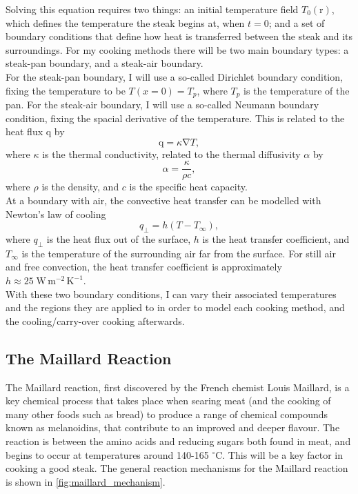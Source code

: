\documentclass[11pt]{article}
\newcommand{\bvec}[1]{\bm{\mathrm{#1}}}
\newcommand{\grad}{\bvec{\nabla}}
\begin{document}
	Solving this equation requires two things: an initial temperature field $T_0(\bvec{r})$, which defines the temperature the steak begins at, when $t=0$; and a set of boundary conditions that define how heat is transferred between the steak and its surroundings. For my cooking methods there will be two main boundary types: a steak-pan boundary, and a steak-air boundary. \\
	
	For the steak-pan boundary, I will use a so-called Dirichlet boundary condition, fixing the temperature to be $T(x=0) = T_p$, where $T_p$ is the temperature of the pan. For the steak-air boundary, I will use a so-called Neumann boundary condition, fixing the spacial derivative of the temperature. This is related to the heat flux $\bvec{q}$ by\cite{heat_equation}
	\begin{equation}
		\bvec{q} = \kappa \grad T,
	\end{equation}
	where $\kappa$ is the thermal conductivity, related to the thermal diffusivity $\alpha$ by
	\begin{equation}
		\alpha = \frac{\kappa}{\rho c},
	\end{equation}
	where $\rho$ is the density, and $c$ is the specific heat capacity. \\
	
	At a boundary with air, the convective heat transfer can be modelled with Newton's law of cooling\cite{convection}
	\begin{equation}
		q_\perp = h(T - T_\infty),
	\end{equation}
	where $q_\perp$ is the heat flux out of the surface, $h$ is the heat transfer coefficient, and $T_\infty$ is the temperature of the surrounding air far from the surface. For still air and free convection, the heat transfer coefficient is approximately $h \approx 25\;\mathrm{W}\,\mathrm{m}^{-2}\,\mathrm{K}^{-1}$\cite{heat_transfer_coeff}. \\
	
	With these two boundary conditions, I can vary their associated temperatures and the regions they are applied to in order to model each cooking method, and the cooling/carry-over cooking afterwards.
	
	\subsection{The Maillard Reaction}
	
	\label{maillard_reaction}
	
	The Maillard reaction, first discovered by the French chemist Louis Maillard\cite{maillard}, is a key chemical process that takes place when searing meat (and the cooking of many other foods such as bread) to produce a range of chemical compounds known as melanoidins, that contribute to an improved and deeper flavour. The reaction is between the amino acids and reducing sugars both found in meat, and begins to occur at temperatures around 140-165 $^\circ \text{C}$\cite{maillard_temp}. This will be a key factor in cooking a good steak. The general reaction mechanisms for the Maillard reaction is shown in \autoref{fig:maillard_mechanism}.
	
\end{document}
